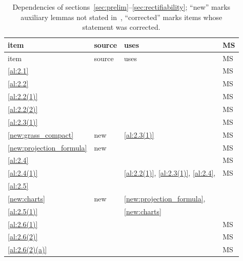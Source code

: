 \documentclass[a4paper,twoside,leqno]{article}
\begin{document}
\begin{center}
\small
\begin{longtable}{p{}p{}p{}p{}}
    \caption{Dependencies of sections~\ref{sec:prelim}--\ref{sec:rectifiability}; ``new'' marks
    auxiliary lemmas not stated in~\cite{Allard1972}, ``corrected'' marks items whose statement
    was corrected.}
    \label{tab:dependencies} \\
    item & source & uses & MS \\
    \hline
    \endfirsthead
    item & source & uses & MS \\
    \hline
    \endhead
\ref{al:2.1} & \cite[2.1]{Allard1972} & \cite[3.1.21, 2.5.13]{Federer1969} & MS \\
\ref{al:2.2} & \cite[2.2]{Allard1972} & \cite[1.3.1, 1.7.4--1.7.6, 1.7.9]{Federer1969} & MS \\
\ref{al:2.2(1)} & \cite[2.2(1)]{Allard1972} & \cite[1.3.1, 1.3.4, 1.4.3]{Federer1969} & MS \\
\ref{al:2.2(2)} & \cite[2.2(2)]{Allard1972} & \cite[1.7.6]{Federer1969} & MS \\
\ref{al:2.3(1)} & \cite[2.3(1)--(5)]{Allard1972} & \cite[1.7.6]{Federer1969} & MS \\
\ref{new:grass_compact} & new & \ref{al:2.3(1)} & MS \\
\ref{new:projection_formula} & new & \cite[1.7.6]{Federer1969} & MS \\
\ref{al:2.4} & \cite[2.4]{Allard1972} & \cite[1.3.4, 1.7.5, 1.7.6, 1.7.9]{Federer1969} & MS \\
\ref{al:2.4(1)} & \cite[2.4(1)]{Allard1972} & \ref{al:2.2(1)}, \ref{al:2.3(1)}, \ref{al:2.4}, \cite[1.7.6]{Federer1969} & MS \\
\ref{al:2.5} & \cite[2.5]{Allard1972} & \cite[3.1.19, 3.1.21]{Federer1969} &  \\
\ref{new:charts} & new & \ref{new:projection_formula}, \cite[3.1.19, 3.1.21]{Federer1969} &  \\
\ref{al:2.5(1)} & \cite[2.5(1)--(3)]{Allard1972} & \ref{new:charts} &  \\
\ref{al:2.6(1)} & \cite[2.6(1)]{Allard1972} & \cite[2.1.2, 2.1.3, 2.2.3]{Federer1969} & MS \\
\ref{al:2.6(2)} & \cite[2.6(2)]{Allard1972} & \cite[2.2.2, 2.2.3, 2.2.5, 2.5.13, 2.5.14, 2.5.19]{Federer1969} & MS \\
\ref{al:2.6(2)(a)} & \cite[2.6(2)(a)--(d)]{Allard1972} & \cite[2.4.6, 2.5.19, 2.6.2]{Federer1969} & MS \\

\end{longtable}
\end{center}
\end{document}
